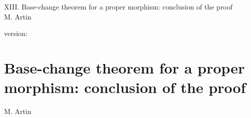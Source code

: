 \documentclass[10pt]{../fichiers-configuration-latex/smfart}
\begin{document}
\begin{center}
XIII. Base-change theorem for a proper morphism: conclusion of the proof\\
M. Artin
\end{center}

version: \showgitstatus
\tableofcontents

\else
\chapter{Base-change theorem for a proper morphism: conclusion of the proof}
\begin{center}
M. Artin
\end{center}
\fi
{}\label{sga4.exp.XIII}




\end{document}
